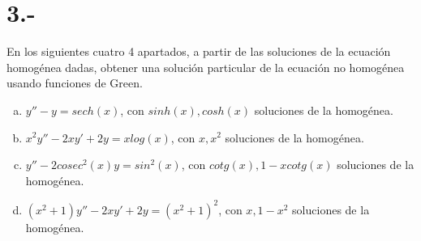 \documentclass{article}
\begin{document}
\section*{3.-} 
En los siguientes cuatro 4 apartados, a partir de las soluciones
de la ecuación homogénea dadas, obtener una solución particular 
de la ecuación no homogénea usando funciones de Green.
\begin{enumerate}[a)]
    \item $y''-y=sech(x)$, con $sinh(x), cosh(x)$ soluciones de la homogénea.
    \item $x^2y''-2xy'+2y=xlog(x)$, con $x, x^2$ soluciones de la homogénea.
    \item $y''-2cosec^2(x)y=sin^2(x)$, con $cotg(x), 1-xcotg(x)$ soluciones de la homogénea.
    \item $(x^2+1)y''-2xy'+2y=(x^2+1)^2$, con $x, 1-x^2$ soluciones de la homogénea.
\end{enumerate}
\end{document}
